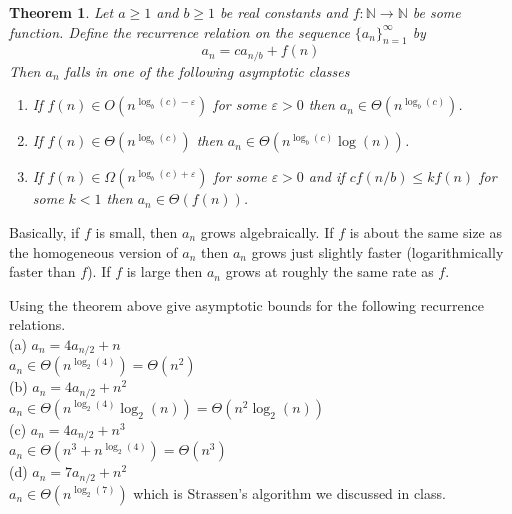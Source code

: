 \documentclass[16 pt]{amsart}
\newtheorem{thm}{Theorem}
\theoremstyle{definition}
\theoremstyle{remark}
\numberwithin{equation}{subsection}
\begin{document}
\begin{thm}
Let $a\ge 1$ and $b\ge 1$ be real constants and $f:\mathbb{N}\rightarrow\mathbb{N}$ be some function.  Define the recurrence relation on the sequence $\{a_n\}_{n=1}^{\infty}$ by
\[
a_n = c a_{n/b} + f(n)
\]
Then $a_n$ falls in one of the following asymptotic classes

\begin{enumerate}
\item If $f(n)\in O(n^{\log_b(c)-\varepsilon})$ for some $\varepsilon>0$ then $a_n \in \Theta(n^{\log_b(c)})$.\\
\item If $f(n)\in \Theta(n^{\log_b(c)})$ then $a_n \in \Theta(n^{\log_b(c)}\log(n))$.\\
\item If $f(n)\in \Omega(n^{\log_b(c)+\varepsilon})$ for some $\varepsilon>0$ and if $cf(n/b) \le kf(n)$ for some $k<1$ 
then $a_n \in \Theta(f(n))$.\\
\end{enumerate}

\end{thm}

Basically, if $f$ is small, then $a_n$ grows algebraically.  If $f$ is about the same size as the homogeneous version of $a_n$ then $a_n$ grows just slightly faster (logarithmically faster than $f$).  If $f$ is large then $a_n$ grows at roughly the same rate as $f$.


Using the theorem above give asymptotic bounds for the following recurrence relations.\\

(a) $a_n = 4a_{n/2}+n$\\

$a_n \in \Theta (n^{\log_2(4)}) = \Theta(n^2)$\\



(b) $a_n = 4a_{n/2}+n^2$\\

$a_n \in \Theta (n^{\log_2(4)}\log_2(n)) = \Theta(n^2\log_2(n))$\\


(c) $a_n = 4a_{n/2}+n^3$\\

$a_n \in \Theta (n^3 + n^{\log_2(4)}) = \Theta(n^3)$\\


(d) $a_n = 7a_{n/2}+n^2$\\

$a_n \in \Theta(n^{\log_2(7)})$
which is Strassen's algorithm we discussed in class.\\
\end{document}
